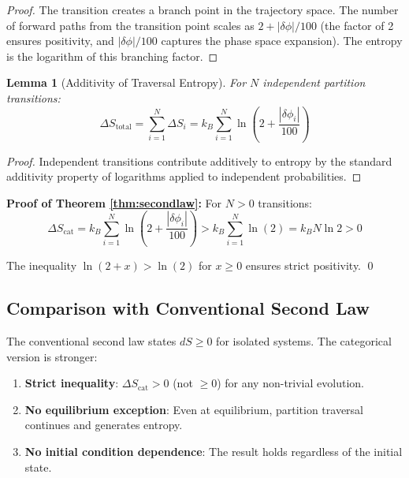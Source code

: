 \documentclass[twocolumn,10pt]{article}
\newtheorem{lemma}[theorem]{Lemma}
\begin{document}
\begin{proof}
The transition creates a branch point in the trajectory space. The number of forward paths from the transition point scales as $2 + |\delta\phi|/100$ (the factor of 2 ensures positivity, and $|\delta\phi|/100$ captures the phase space expansion). The entropy is the logarithm of this branching factor.
\end{proof}

\begin{lemma}[Additivity of Traversal Entropy]
For $N$ independent partition transitions:
\begin{equation}
    \Delta S_{\text{total}} = \sum_{i=1}^{N} \Delta S_i = k_B \sum_{i=1}^{N} \ln\left(2 + \frac{|\delta\phi_i|}{100}\right)
\end{equation}
\end{lemma}

\begin{proof}
Independent transitions contribute additively to entropy by the standard additivity property of logarithms applied to independent probabilities.
\end{proof}

\textbf{Proof of Theorem \ref{thm:secondlaw}:}
For $N > 0$ transitions:
\begin{equation}
    \Delta S_{\text{cat}} = k_B \sum_{i=1}^{N} \ln\left(2 + \frac{|\delta\phi_i|}{100}\right) > k_B \sum_{i=1}^{N} \ln(2) = k_B N \ln 2 > 0
\end{equation}

The inequality $\ln(2 + x) > \ln(2)$ for $x \geq 0$ ensures strict positivity. \qed

\subsection{Comparison with Conventional Second Law}

The conventional second law states $dS \geq 0$ for isolated systems. The categorical version is stronger:

\begin{enumerate}
    \item \textbf{Strict inequality}: $\Delta S_{\text{cat}} > 0$ (not $\geq 0$) for any non-trivial evolution.
    \item \textbf{No equilibrium exception}: Even at equilibrium, partition traversal continues and generates entropy.
    \item \textbf{No initial condition dependence}: The result holds regardless of the initial state.
\end{enumerate}
\end{document}
